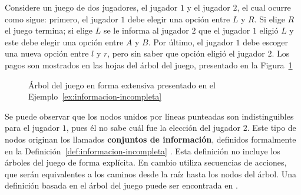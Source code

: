 \begin{example}
\label{ex:informacion-incompleta}
Considere un juego de dos jugadores, el jugador $1$ y el jugador $2$, el cual ocurre como sigue: primero, el jugador $1$ debe elegir una opción entre $L$ y $R$. Si elige $R$ el juego termina; si elige $L$ se le informa al jugador $2$ que el jugador $1$ eligió $L$ y este debe elegir una opción entre $A$ y $B$. Por último, el jugador $1$ debe escoger una nueva opción entre $l$ y $r$, pero sin saber que opción eligió el jugador $2$. Los pagos son mostrados en las hojas del árbol del juego, presentado en la Figura~\ref{fig:informacion-incompleta}
\end{example}

\begin{figure}
\begin{center}
\caption{Árbol del juego en forma extensiva presentado en el Ejemplo~\ref{ex:informacion-incompleta}}
\label{fig:informacion-incompleta}
\end{center}
\end{figure}

Se puede observar que los nodos unidos por líneas punteadas son indistinguibles para el jugador $1$, pues él no sabe cuál fue la elección del jugador $2$. Este tipo de nodos originan los llamados \textbf{conjuntos de información}, definidos formalmente en la Definición~\ref{def:informacion-incompleta} \cite[p.~200]{bib:course-game-theory}. Esta definición no incluye los árboles del juego de forma explícita. En cambio utiliza secuencias de acciones, que serán equivalentes a los caminos desde la raíz hasta los nodos del árbol. Una definición basada en el árbol del juego puede ser encontrada en \cite{bib:conceptos-basicos}.

